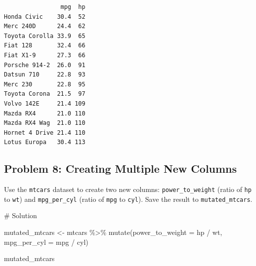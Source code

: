\documentclass[
  letterpaper,
  DIV=11,
  numbers=noendperiod]{scrreprt}
\newenvironment{Shaded}{\begin{snugshade}}{\end{snugshade}}
\newcommand{\AttributeTok}[1]{\textcolor[rgb]{0.40,0.45,0.13}{#1}}
\newcommand{\CommentTok}[1]{\textcolor[rgb]{0.37,0.37,0.37}{#1}}
\newcommand{\FunctionTok}[1]{\textcolor[rgb]{0.28,0.35,0.67}{#1}}
\newcommand{\NormalTok}[1]{\textcolor[rgb]{0.00,0.23,0.31}{#1}}
\newcommand{\OtherTok}[1]{\textcolor[rgb]{0.00,0.23,0.31}{#1}}
\newcommand{\SpecialCharTok}[1]{\textcolor[rgb]{0.37,0.37,0.37}{#1}}
\begin{document}
\begin{verbatim}
                mpg  hp
Honda Civic    30.4  52
Merc 240D      24.4  62
Toyota Corolla 33.9  65
Fiat 128       32.4  66
Fiat X1-9      27.3  66
Porsche 914-2  26.0  91
Datsun 710     22.8  93
Merc 230       22.8  95
Toyota Corona  21.5  97
Volvo 142E     21.4 109
Mazda RX4      21.0 110
Mazda RX4 Wag  21.0 110
Hornet 4 Drive 21.4 110
Lotus Europa   30.4 113
\end{verbatim}

\subsection*{Problem 8: Creating Multiple New
Columns}\label{problem-8-creating-multiple-new-columns}

Use the \texttt{mtcars} dataset to create two new columns:
\texttt{power\_to\_weight} (ratio of \texttt{hp} to \texttt{wt}) and
\texttt{mpg\_per\_cyl} (ratio of \texttt{mpg} to \texttt{cyl}). Save the
result to \texttt{mutated\_mtcars}.

\begin{Shaded}
\begin{Highlighting}[]
\CommentTok{\# Solution}

\NormalTok{mutated\_mtcars }\OtherTok{\textless{}{-}}\NormalTok{ mtcars }\SpecialCharTok{\%\textgreater{}\%}
  \FunctionTok{mutate}\NormalTok{(}\AttributeTok{power\_to\_weight =}\NormalTok{ hp }\SpecialCharTok{/}\NormalTok{ wt,}
         \AttributeTok{mpg\_per\_cyl =}\NormalTok{ mpg }\SpecialCharTok{/}\NormalTok{ cyl)}

\NormalTok{mutated\_mtcars}
\end{Highlighting}
\end{Shaded}
\end{document}
